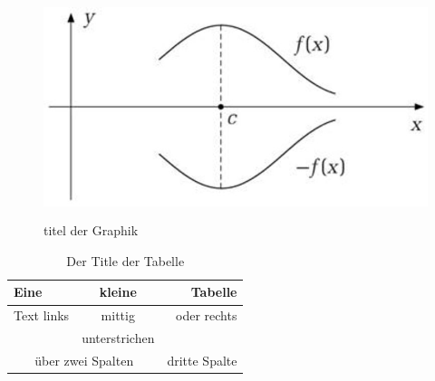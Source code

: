 \documentclass[a4paper,12pt]{article}
\begin{document}
\begin{figure}
\caption{titel der Graphik}
\label{fig:andereGraphik} \centering
\includegraphics[angle=90,height=6.5cm]{abb2.jpg}  %

\end{figure}

\begin{table}
\caption{Der Title der Tabelle}
\label{tab:Tabelle}
\centering
 \begin{tabular}{lc|r}
   Eine & kleine & Tabelle\\
\hline
   Text links & mittig & oder rechts \\
   & unterstrichen  & \\
\cline{2-2}
   \multicolumn{2}{c|}{\"uber zwei Spalten} & dritte Spalte \\
\end{tabular}   
\end{table}

   
\end{document}
